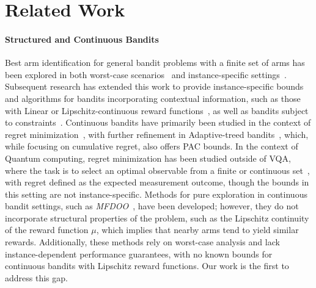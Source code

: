 \section{Related Work}
\label{sec:related_work}
\paragraph*{Structured and Continuous Bandits}
Best arm identification for general bandit problems with a finite set of arms has been explored in both worst-case scenarios~\cite{10.1007/978-3-642-04414-4_7} and instance-specific settings~\cite{pmlr-v49-garivier16a, NEURIPS2019_8d1de745}. Subsequent research has extended this work to provide instance-specific bounds and algorithms for bandits incorporating contextual information, such as those with Linear or Lipschitz-continuous reward functions~\cite{wang2021fast}, as well as bandits subject to constraints~\cite{pmlr-v238-carlsson24a}. Continuous bandits have primarily been studied in the context of regret minimization~\cite{bubeck2011x, KleinbergSU19}, with further refinement in Adaptive-treed bandits~\cite{bull2015adaptive}, which, while focusing on cumulative regret, also offers PAC bounds. In the context of Quantum computing, regret minimization has been studied outside of VQA, where the task is to select an optimal observable from a finite or continuous set~\cite{Lumbreras2022multiarmedquantum, lumbreras2024learningpurequantumstates}, with regret defined as the expected measurement outcome, though the bounds in this setting are not instance-specific. Methods for pure exploration in continuous bandit settings, such as \emph{MFDOO}~\cite{demontbrun2024certified}, have been developed; however, they do not incorporate structural properties of the problem, such as the Lipschitz continuity of the reward function $\mu$, which implies that nearby arms tend to yield similar rewards. Additionally, these methods rely on worst-case analysis and lack instance-dependent performance guarantees, with no known bounds for continuous bandits with Lipschitz reward functions. Our work is the first to address this gap.
\vspace{-3mm}

